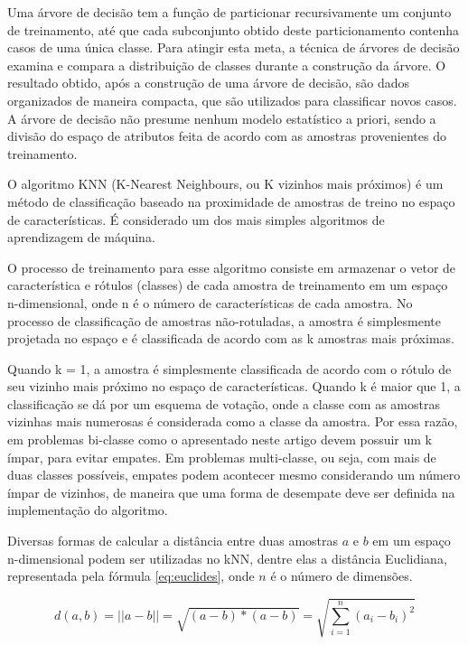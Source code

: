 Uma árvore de decisão tem a função de particionar recursivamente um conjunto de treinamento, até que cada subconjunto obtido deste particionamento contenha casos de uma única classe. Para atingir esta meta, a técnica de árvores de decisão examina e compara a distribuição de classes durante a construção da árvore. O resultado obtido, após a construção de uma árvore de decisão, são dados organizados de maneira compacta, que são utilizados para classificar novos casos. A árvore de decisão não presume nenhum modelo estatístico a priori, sendo a divisão do espaço de atributos feita de acordo com as amostras provenientes do treinamento.


O algoritmo KNN (K-Nearest Neighbours, ou K vizinhos mais próximos) \cite{cover:1967} é um método de classificação baseado na proximidade de amostras de treino no espaço de características. É considerado um dos mais simples algoritmos de aprendizagem de máquina.

O processo de treinamento para esse algoritmo consiste em armazenar o vetor de característica e rótulos (classes) de cada amostra de treinamento em um espaço n-dimensional, onde n é o número de características de cada amostra. No processo de classificação de amostras não-rotuladas, a amostra é simplesmente projetada no espaço e é classificada de acordo com as k amostras mais próximas.

Quando k = 1, a amostra é simplesmente classificada de acordo com o rótulo de seu vizinho mais próximo no espaço de características. Quando k é maior que 1, a classificação se dá por um esquema de votação, onde a classe com as amostras vizinhas mais numerosas é considerada como a classe da amostra. Por essa razão, em problemas bi-classe como o apresentado neste artigo devem possuir um k ímpar, para evitar empates. Em problemas multi-classe, ou seja, com mais de duas classes possíveis, empates podem acontecer mesmo considerando um número ímpar de vizinhos, de maneira que uma forma de desempate deve ser definida na implementação do algoritmo.

Diversas formas de calcular a distância entre duas amostras $a$ e $b$ em um espaço n-dimensional podem ser utilizadas no kNN, dentre elas a distância Euclidiana, representada pela fórmula \ref{eq:euclides}, onde $n$ é o número de dimensões.

\begin{equation}
	\displaystyle d(a,b) = ||a - b|| = \sqrt{(a - b)*(a -b)} =
	\displaystyle \sqrt{\sum_{i=1}^{n}(a_i - b_i)^2}
\label{eq:euclides}
\end{equation}

